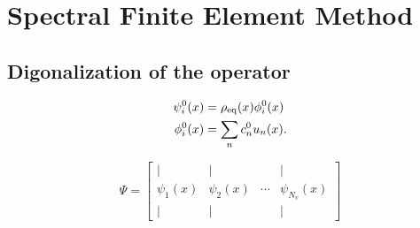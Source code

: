 \chapter{Spectral Finite Element Method}
\section{Digonalization of the operator}
\begin{definition}
\begin{align}
        \psi^0_i(x) &= \rho_{\rm eq}(x) \phi^0_i(x) \\
        \phi^0_i(x) &= \sum_n c^0_n u_n(x).
\end{align}
\label{basisfunctions}
\end{definition}

\begin{definition}
\begin{equation}
\Psi=
\begin{bmatrix}
\vert & \vert &  & \vert \\
\psi_1(x) & \psi_2(x) & \cdots & \psi_{N_v}(x) \\
\vert & \vert &  & \vert 
\end{bmatrix}
\end{equation}
\label{eigenvectormatrix}
\end{definition}